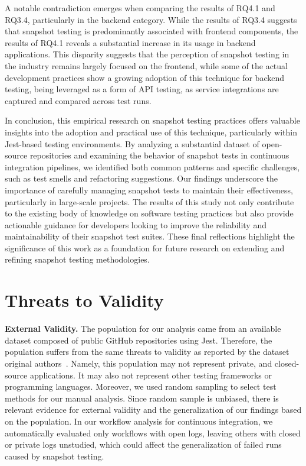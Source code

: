 \documentclass[
	msc, %
	english %
]{../ppgccufmg}
\begin{document}
        A notable contradiction emerges when comparing the results of RQ4.1 and RQ3.4, particularly in the backend category. While the results of RQ3.4 suggests that snapshot testing is predominantly associated with frontend components, the results of RQ4.1 reveals a substantial increase in its usage in backend applications. This disparity suggests that the perception of snapshot testing in the industry remains largely focused on the frontend, while some of the actual development practices show a growing adoption of this technique for backend testing, being leveraged as a form of API testing, as service integrations are captured and compared across test runs.

        In conclusion, this empirical research on snapshot testing practices offers valuable insights into the adoption and practical use of this technique, particularly within Jest-based testing environments. By analyzing a substantial dataset of open-source repositories and examining the behavior of snapshot tests in continuous integration pipelines, we identified both common patterns and specific challenges, such as test smells and refactoring suggestions. Our findings underscore the importance of carefully managing snapshot tests to maintain their effectiveness, particularly in large-scale projects. The results of this study not only contribute to the existing body of knowledge on software testing practices but also provide actionable guidance for developers looking to improve the reliability and maintainability of their snapshot test suites. These final reflections highlight the significance of this work as a foundation for future research on extending and refining snapshot testing methodologies.
         
        \section{Threats to Validity}\label{sec:ch4-threats}

        \noindent \textbf{External Validity.} The population for our analysis came from an available dataset composed of public GitHub repositories using Jest. Therefore, the population suffers from the same threats to validity as reported by the dataset original authors~\cite{fujita2023empirical}. Namely, this population may not represent private, and closed-source applications. It may also not represent other testing frameworks or programming languages.
        Moreover, we used random sampling to select test methods for our manual analysis. Since random sample is unbiased, there is relevant evidence for external validity and the generalization of our findings based on the population.
        In our workflow analysis for continuous integration, we automatically evaluated only workflows with open logs, leaving others with closed or private logs unstudied, which could affect the generalization of failed runs caused by snapshot testing.\\
        
\end{document}
